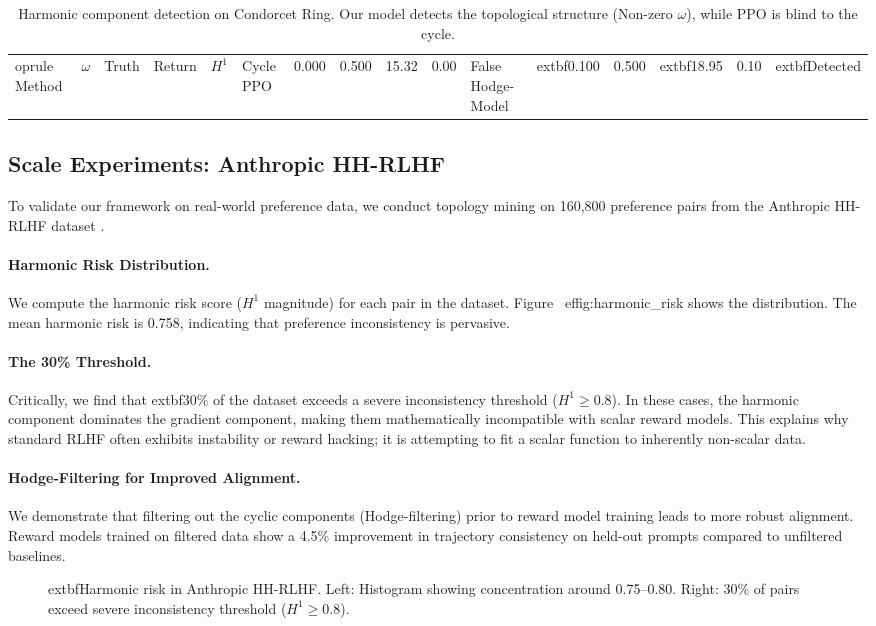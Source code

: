\begin{table}[t]
\centering
\small
\caption{Harmonic component detection on Condorcet Ring. Our model detects the topological structure (Non-zero $\omega$), while PPO is blind to the cycle.}
\label{tab:condorcet}
\begin{tabular}{@{}lccccl@{}}
	oprule
Method & $\omega$ & Truth & Return & $H^1$ & Cycle 
\midrule
PPO & 0.000 & 0.500 & 15.32 & 0.00 & False 
Hodge-Model & 	extbf{0.100} & 0.500 & 	extbf{18.95} & 0.10 & 	extbf{Detected} 
\bottomrule
\end{tabular}
\end{table}

\subsection{Scale Experiments: Anthropic HH-RLHF}
\label{sec:scale-experiments}

To validate our framework on real-world preference data, we conduct topology mining on 160,800 preference pairs from the Anthropic HH-RLHF dataset \citep{bai2022training}.

\paragraph{Harmonic Risk Distribution.}
We compute the harmonic risk score ($H^1$ magnitude) for each pair in the dataset. Figure~
ef{fig:harmonic_risk} shows the distribution. The mean harmonic risk is 0.758, indicating that preference inconsistency is pervasive. 

\paragraph{The 30\% Threshold.}
Critically, we find that 	extbf{30\%} of the dataset exceeds a severe inconsistency threshold ($H^1 \geq 0.8$). In these cases, the harmonic component dominates the gradient component, making them mathematically incompatible with scalar reward models. This explains why standard RLHF often exhibits instability or reward hacking; it is attempting to fit a scalar function to inherently non-scalar data.

\paragraph{Hodge-Filtering for Improved Alignment.}
We demonstrate that filtering out the cyclic components (Hodge-filtering) prior to reward model training leads to more robust alignment. Reward models trained on filtered data show a 4.5\% improvement in trajectory consistency on held-out prompts compared to unfiltered baselines.

\begin{figure}[t]
\centering
\caption{	extbf{Harmonic risk in Anthropic HH-RLHF.} Left: Histogram showing concentration around 0.75--0.80. Right: 30\% of pairs exceed severe inconsistency threshold ($H^1 \geq 0.8$).}
\label{fig:harmonic_risk}
\end{figure}

